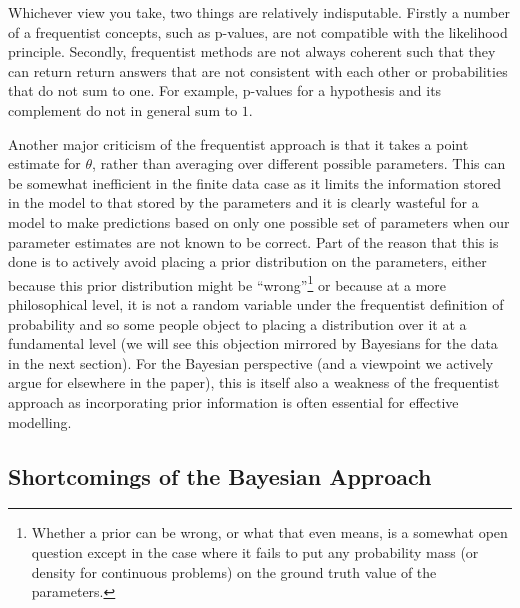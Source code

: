 Whichever view you take, two things are relatively indisputable.  Firstly a number of a frequentist concepts, such as p-values,
are not compatible with the likelihood principle.  Secondly, frequentist methods are not always coherent such that they can
return return answers that are not consistent with each other or probabilities that do not sum to one.  For example, p-values
for a hypothesis and its complement do not in general sum to $1$.  

Another major criticism of the frequentist approach is that it takes a point estimate for $\theta$, rather than averaging
over different possible parameters.  This can be somewhat inefficient in the finite data case as it limits the information
stored in the model to that stored by the parameters and it is clearly wasteful for a model to make predictions based on
only one possible set of parameters when our parameter estimates are not known to be correct.  Part of the reason that this
is done is to actively avoid placing a prior distribution on the parameters, either because this prior distribution might
be ``wrong''\footnote{Whether a prior can be wrong, or what that even means, is a somewhat open question except in the
	case where it fails to put any probability mass (or density for continuous problems) on the ground truth value of
	the parameters.} or because at a more philosophical level, it is not a random variable under the frequentist definition
of probability and so some people object to placing a distribution over it at a fundamental level (we will see this objection
mirrored by Bayesians for the data in the next section).  For the Bayesian perspective (and a viewpoint we actively 
argue for elsewhere in the paper), this is itself also a weakness of the frequentist approach as incorporating prior
information is often essential for effective modelling.


\subsection{Shortcomings of the Bayesian Approach}
\label{sec:bayes:religion:bayes}

